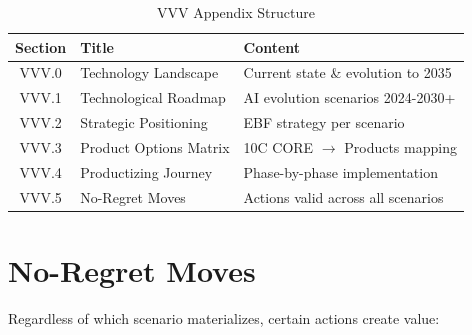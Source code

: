 \begin{table}[htbp]
\centering
\caption{VVV Appendix Structure}
\label{tab:vvv-structure}
\renewcommand{\arraystretch}{1.3}
\begin{tabular}{@{}clp{8cm}@{}}
\toprule
\textbf{Section} & \textbf{Title} & \textbf{Content} \\
\midrule
VVV.0 & Technology Landscape & Current state \& evolution to 2035 \\
VVV.1 & Technological Roadmap & AI evolution scenarios 2024-2030+ \\
VVV.2 & Strategic Positioning & EBF strategy per scenario \\
VVV.3 & Product Options Matrix & 10C CORE $\to$ Products mapping \\
VVV.4 & Productizing Journey & Phase-by-phase implementation \\
VVV.5 & No-Regret Moves & Actions valid across all scenarios \\
\bottomrule
\end{tabular}
\end{table}










\section{No-Regret Moves}
\label{sec:vvv-no-regret}

Regardless of which scenario materializes, certain actions create value:


